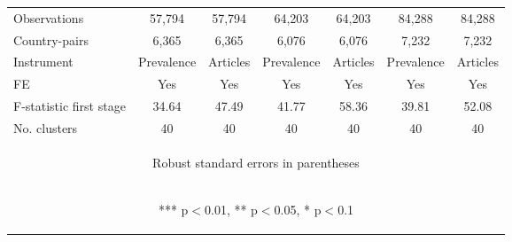 \documentclass{article}
\begin{document}
\begin{table}[htbp]
{\begin{tabular}{lcccccc}
Observations & 57,794 & 57,794 & 64,203 & 64,203 & 84,288 & 84,288 \\
Country-pairs & 6,365 & 6,365 & 6,076 & 6,076 & 7,232 & 7,232 \\
Instrument & Prevalence & Articles & Prevalence & Articles & Prevalence & Articles \\
FE & Yes & Yes & Yes & Yes & Yes & Yes \\
F-statistic first stage & 34.64 & 47.49 & 41.77 & 58.36 & 39.81 & 52.08 \\
No. clusters & 40 & 40 & 40 & 40 & 40 & 40 \\ \hline
\multicolumn{7}{c}{\begin{footnotesize} Robust standard errors in parentheses\end{footnotesize}} \\
\multicolumn{7}{c}{\begin{footnotesize} *** p$<$0.01, ** p$<$0.05, * p$<$0.1\end{footnotesize}} \\
\end{tabular}
}
\end{table}
\end{document}
